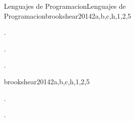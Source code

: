 \begin{syllabus}

\begin{unit}{Lenguajes de Programacion}{Lenguajes de Programacion}{brookshear2014}{2}{a,b,c,h,1,2,5}
   \begin{topics}
      \item \PLProgramRepresentationTopicPrograms
      \item \PLProgramRepresentationTopicAbstract
      \item \PLProgramRepresentationTopicData
   \end{topics}
   \begin{learningoutcomes}
      \item \PLProgramRepresentationLOExplainHowProcess [\Familiarity].
      \item \PLProgramRepresentationLODescribeAnTree [\Familiarity].
      \item \PLProgramRepresentationLODescribeTheHaving [\Familiarity].
   \end{learningoutcomes}
\end{unit}

\begin{unit}{\SESoftwareProcesses}{}{brookshear2014}{2}{a,b,c,h,1,2,5}
   \begin{topics}
      \item \SESoftwareProcessesTopicIntroduction
      \item \SESoftwareProcessesTopicSystem
      \item \SESoftwareProcessesTopicSoftware
   \end{topics}
   \begin{learningoutcomes}
      \item \SESoftwareProcessesLODescribeHowInteract [\Familiarity].
      \item \SESoftwareProcessesLODescribeTheAndSeveral [\Familiarity].
   \end{learningoutcomes}
\end{unit}


\end{syllabus}
